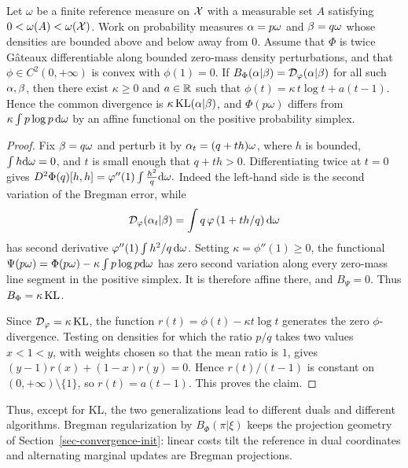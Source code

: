 \begin{prop}\label{prop-kl-only-bregman-phi}
Let $\omega$ be a finite reference measure on $\mathcal{X}$ with a measurable set $A$ satisfying $0<\omega(A)<\omega(\mathcal{X})$. Work on probability measures $\alpha=p\omega$ and $\beta=q\omega$ whose densities are bounded above and below away from $0$. Assume that $\Phi$ is twice G\^ateaux differentiable along bounded zero-mass density perturbations, and that $\phi\in C^2(0,+\infty)$ is convex with $\phi(1)=0$. If
\(B_\Phi(\alpha|\beta)=\mathcal{D}_\varphi(\alpha|\beta)\)
for all such $\alpha,\beta$, then there exist $\kappa\geq0$ and $a\in\mathbb{R}$ such that
\(\phi(t)=\kappa\,t\log t+a(t-1).\)
Hence the common divergence is $\kappa\operatorname{KL}(\alpha|\beta)$, and $\Phi(p\omega)$ differs from $\kappa\int p\log p\,\mathrm{d}\omega$ by an affine functional on the positive probability simplex.
\end{prop}
\begin{proof}
Fix $\beta=q\omega$ and perturb it by $\alpha_t=(q+t h)\omega$, where $h$ is bounded, $\int h\mathrm{d}\omega=0$, and $t$ is small enough that $q+t h>0$. Differentiating twice at $t=0$ gives
\(D^2\Phi(q)[h,h] = \varphi''(1)\int \frac{h^2}{q}\mathrm{d}\omega.\)
Indeed the left-hand side is the second variation of the Bregman error, while
\[
\mathcal{D}_\varphi(\alpha_t|\beta)
=
\int q\,\varphi\left(1+t h/q\right)\mathrm{d}\omega
\]
has second derivative $\varphi''(1)\int h^2/q\,\mathrm{d}\omega$. Setting $\kappa=\phi''(1)\geq0$, the functional $\Psi(p\omega)=\Phi(p\omega)-\kappa\int p\log p\mathrm{d}\omega$ has zero second variation along every zero-mass line segment in the positive simplex. It is therefore affine there, and $B_\Psi=0$. Thus $B_\Phi=\kappa\operatorname{KL}$.

Since $\mathcal{D}_\varphi=\kappa\operatorname{KL}$, the function $r(t)=\phi(t)-\kappa t\log t$ generates the zero $\phi$-divergence. Testing on densities for which the ratio $p/q$ takes two values $x<1<y$, with weights chosen so that the mean ratio is $1$, gives $(y-1)r(x)+(1-x)r(y)=0$. Hence $r(t)/(t-1)$ is constant on $(0,+\infty)\setminus\{1\}$, so $r(t)=a(t-1)$. This proves the claim.
\end{proof}
Thus, except for KL, the two generalizations lead to different duals and different algorithms. Bregman regularization by $B_\Phi(\pi|\xi)$ keeps the projection geometry of Section~\ref{sec-convergence-init}: linear costs tilt the reference in dual coordinates and alternating marginal updates are Bregman projections.

